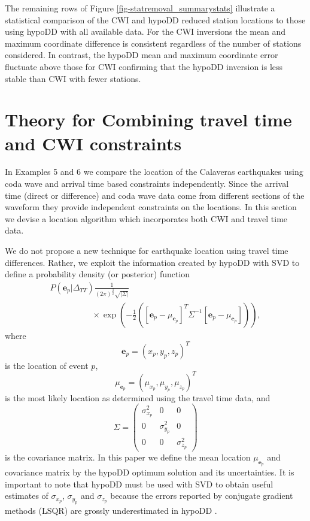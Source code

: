 \documentclass[extra, onecolumn, doublespacing]{gji}
\begin{document}
The remaining rows of Figure \ref{fig-statremoval_summarystats}
illustrate a statistical comparison of the CWI and hypoDD reduced
station locations to those using hypoDD with all available data. For
the CWI inversions the mean and maximum coordinate difference is
consistent regardless of the number of stations considered. In
contrast, the hypoDD mean and maximum coordinate error fluctuate
above those for CWI confirming that the hypoDD inversion is less
stable than CWI with fewer stations.

\section{Theory for Combining travel time and CWI constraints}
\label{sec:CalaverasLoc-CWIandTT}
In Examples 5 and 6 we compare the location of the Calaveras
earthquakes using coda wave and arrival time based constraints
independently. Since the arrival time (direct or difference) and
coda wave data
 come from different sections of the waveform they provide independent constraints on the locations.
 In this section we devise a location algorithm which incorporates
 both CWI and travel time data.

We do not propose a new technique for earthquake location using
travel time differences. Rather, we exploit the information created
by hypoDD with SVD to define a probability density (or posterior)
function
\begin{equation}
\label{eq-multi-var-Gauss-tt}
\begin{array}{l}
P(\mathbf{e}_p|\Delta_{TT})
\frac{1}{(2\pi)^{\frac{3}{2}}\sqrt{|\Sigma|}} \\
\hspace{5em} \times \exp
\left({-\frac{1}{2}\left([\mathbf{e}_p-\mu_{\mathbf{e}_p}]^T
\Sigma^{-1} [\mathbf{e}_p-\mu_{\mathbf{e}_p}]\right)} \right),
\end{array}
\end{equation}
where
\begin{equation}
\mathbf{e}_p = (x_p,y_p,z_p)^T
\end{equation}
is the location of event $p$,
\begin{equation}
\mu_{\mathbf{e}_p} = (\mu_{x_p}, \mu_{y_p},\mu_{z_p})^T
\end{equation}
is the most likely location as determined using the travel time
data, and
\begin{equation}
\label{eq:Sigma-expression}
\Sigma = \left( \begin{array}{ccc} \sigma_{x_p}^2 & 0 & 0\\
0 &  \sigma_{y_p}^2 & 0 \\
0 & 0 & \sigma_{z_p}^2  \end{array} \right)
\end{equation}
is the covariance matrix. In this paper we define the mean location
$\mu_{\mathbf{e}_p}$ and covariance matrix by the hypoDD optimum
solution and its uncertainties. It is important to note that hypoDD
must be used with SVD to obtain useful estimates of $\sigma_{x_p}$,
$\sigma_{y_p}$ and $\sigma_{z_p}$ because the errors reported by
conjugate gradient methods (LSQR) are grossly underestimated in
hypoDD \citep{dr_Waldhauser01a}.
\end{document}
